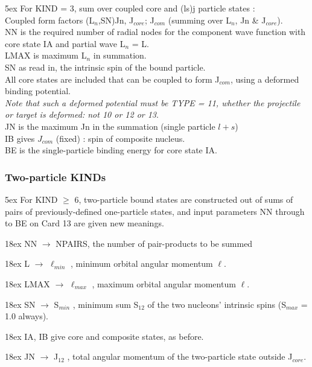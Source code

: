 \documentclass[11pt]{article}
\begin{document}
\hangindent 5ex
For KIND = 3,   sum over coupled core and (ls)j particle states :
\\
Coupled form factors (L$_n$,SN)Jn,  J$_{core}$; J$_{com}$
        (summing over L$_n$,   Jn \& J$_{core}$).
\\
NN is the required number of radial nodes for the component
wave function with core state IA and partial wave L$_n$ = L.
\\
LMAX is maximum L$_n$ in summation.
\\
SN as read in, the intrinsic spin of the bound particle.
\\
All core states are included that can be coupled to form J$_{com}$,
using a deformed binding potential.
\\
{\em Note that such a deformed potential must be TYPE = 11,
whether the projectile or target is deformed: not 10 or 12 or 13}.
\\
JN is the maximum Jn in the summation (single particle $l+s$)
\\
IB gives $J_{com}$ (fixed) : spin of composite nucleus.
\\
BE is the single-particle binding energy for core state IA.

\subsubsection{Two-particle KINDs}
\bigskip

\hangindent 5ex
For KIND $\geq$ 6,   two-particle bound states are constructed out of sums
of pairs of previously-defined one-particle states,
and input parameters NN through to BE on Card 13 are given new meanings.
\bigskip

\hangindent 18ex
NN    $\rightarrow$ NPAIRS, the number of pair-products to be summed

\hangindent 18ex
L     $\rightarrow$ $\ell_{min}$ , minimum orbital angular momentum $\ell$.

\hangindent 18ex
LMAX  $\rightarrow$ $\ell_{max}$  , maximum orbital angular momentum $\ell$.

\hangindent 18ex
SN    $\rightarrow$ S$_{min}$  , minimum sum S$_{12}$ of the two nucleons' intrinsic spins
                 (S$_{max}$ = 1.0 always).

\hangindent 18ex
IA, IB   give core and composite states, as before.

\hangindent 18ex
JN    $\rightarrow$ J$_{12}$   , total angular momentum of the two-particle state
outside J$_{core}$.
\end{document}

